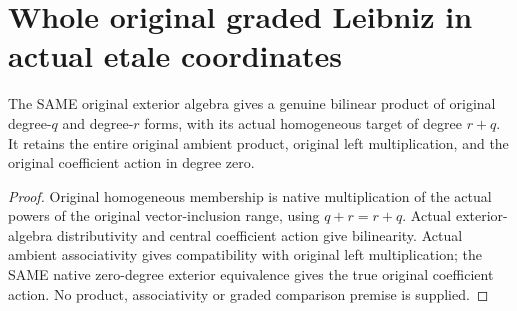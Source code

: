 \section{Whole original graded Leibniz in actual etale coordinates}
\label{sec:etale-graded-leibniz}

\begin{theorem}
\label{lem:cartier-original-homogeneous-exterior-product}
\leanok
The SAME original exterior algebra gives a genuine bilinear product of
original degree-$q$ and degree-$r$ forms, with its actual homogeneous target
of degree $r+q$. It retains the entire original ambient product, original
left multiplication, and the original coefficient action in degree zero.
\end{theorem}
\begin{proof}
Original homogeneous membership is native multiplication of the actual
powers of the original vector-inclusion range, using $q+r=r+q$.
Actual exterior-algebra distributivity and central coefficient action give
bilinearity. Actual ambient associativity gives compatibility with original
left multiplication; the SAME native zero-degree exterior equivalence gives
the true original coefficient action. No product, associativity or graded
comparison premise is supplied.
\end{proof}


